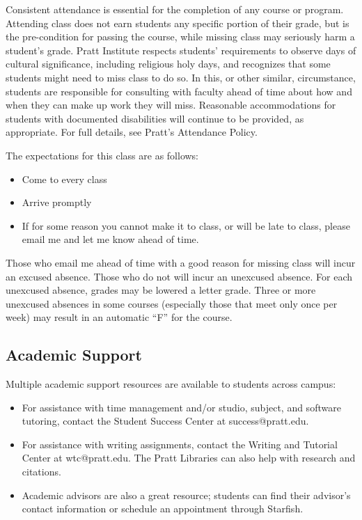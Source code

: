 \documentclass[12pt]{article}
\begin{document}
Consistent attendance is essential for the completion of any course or
program. Attending class does not earn students any specific portion
of their grade, but is the pre-condition for passing the course, while
missing class may seriously harm a student’s grade. Pratt Institute
respects students’ requirements to observe days of cultural
significance, including religious holy days, and recognizes that some
students might need to miss class to do so. In this, or other similar,
circumstance, students are responsible for consulting with faculty
ahead of time about how and when they can make up work they will miss.
Reasonable accommodations for students with documented disabilities
will continue to be provided, as appropriate. For full details, see
Pratt’s Attendance Policy.

The expectations for this class are as follows:
\begin{itemize}
\item Come to every class
\item Arrive promptly
\item If for some reason you cannot make it to class, or will be late to
class, please email me and let me know ahead of time.
\end{itemize}

Those who email me ahead of time with a good reason for missing class
will incur an excused absence. Those who do not will incur an
unexcused absence. For each unexcused absence, grades may be lowered a
letter grade. Three or more unexcused absences in some courses
(especially those that meet only once per week) may result in an
automatic “F” for the course.

\subsection*{Academic Support}
\label{sec:org6d8b991}

Multiple academic support resources are available to students across campus:

\begin{itemize}
\item For assistance with time management and/or studio, subject, and
software tutoring, contact the Student Success Center at
success@pratt.edu.
\item For assistance with writing assignments, contact the Writing and
Tutorial Center at wtc@pratt.edu. The Pratt Libraries can also help
with research and citations.
\item Academic advisors are also a great resource; students can find their
advisor’s contact information or schedule an appointment through
Starfish.
\end{itemize}
\end{document}
